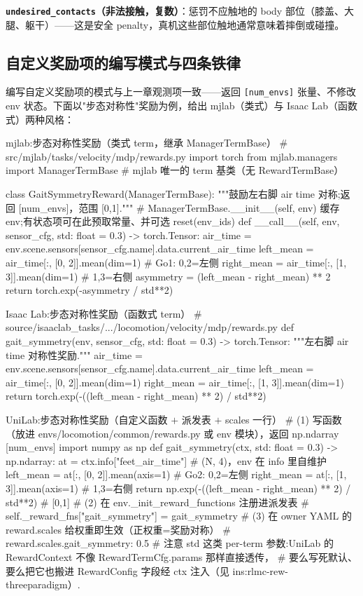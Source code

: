 \textbf{\texttt{undesired\_contacts}（非法接触，复数）}：惩罚不应触地的 body 部位（膝盖、大腿、躯干）——这是安全 penalty，真机这些部位触地通常意味着摔倒或碰撞。

\subsection{自定义奖励项的编写模式与四条铁律}
\label{sec:rlmc-rew-custom}

编写自定义奖励项的模式与上一章观测项一致——返回 \verb|[num_envs]| 张量、不修改 env 状态。下面以"步态对称性"奖励为例，给出 mjlab（类式）与 Isaac Lab（函数式）两种风格：

\begin{codebox}[Python]{mjlab:步态对称性奖励（类式 term，继承 ManagerTermBase）}
# src/mjlab/tasks/velocity/mdp/rewards.py
import torch
from mjlab.managers import ManagerTermBase   # mjlab 唯一的 term 基类（无 RewardTermBase）

class GaitSymmetryReward(ManagerTermBase):
    """鼓励左右脚 air time 对称;返回 [num_envs]，范围 [0,1]."""
    # ManagerTermBase.__init__(self, env) 缓存 env;有状态项可在此预取常量、并可选 reset(env_ids)
    def __call__(self, env, sensor_cfg, std: float = 0.3) -> torch.Tensor:
        air_time = env.scene.sensors[sensor_cfg.name].data.current_air_time
        left_mean  = air_time[:, [0, 2]].mean(dim=1)      # Go1: 0,2=左侧
        right_mean = air_time[:, [1, 3]].mean(dim=1)      # 1,3=右侧
        asymmetry = (left_mean - right_mean) ** 2
        return torch.exp(-asymmetry / std**2)
\end{codebox}

\begin{codebox}[Python]{Isaac Lab:步态对称性奖励（函数式 term）}
# source/isaaclab_tasks/.../locomotion/velocity/mdp/rewards.py
def gait_symmetry(env, sensor_cfg, std: float = 0.3) -> torch.Tensor:
    """左右脚 air time 对称性奖励."""
    air_time = env.scene.sensors[sensor_cfg.name].data.current_air_time
    left_mean  = air_time[:, [0, 2]].mean(dim=1)
    right_mean = air_time[:, [1, 3]].mean(dim=1)
    return torch.exp(-((left_mean - right_mean) ** 2) / std**2)
\end{codebox}

\begin{codebox}[Python]{UniLab:步态对称性奖励（自定义函数 $+$ 派发表 $+$ scales 一行）}
# (1) 写函数（放进 envs/locomotion/common/rewards.py 或 env 模块），返回 np.ndarray [num_envs]
import numpy as np
def gait_symmetry(ctx, std: float = 0.3) -> np.ndarray:
    at = ctx.info["feet_air_time"]                  # (N, 4)，env 在 info 里自维护
    left_mean  = at[:, [0, 2]].mean(axis=1)         # Go2: 0,2=左侧
    right_mean = at[:, [1, 3]].mean(axis=1)         # 1,3=右侧
    return np.exp(-((left_mean - right_mean) ** 2) / std**2)   # [0,1]
# (2) 在 env._init_reward_functions 注册进派发表
#   self._reward_fns["gait_symmetry"] = gait_symmetry
# (3) 在 owner YAML 的 reward.scales 给权重即生效（正权重=奖励对称）
#   reward.scales.gait_symmetry: 0.5
# 注意 std 这类 per-term 参数:UniLab 的 RewardContext 不像 RewardTermCfg.params 那样直接透传，
#   要么写死默认、要么把它也搬进 RewardConfig 字段经 ctx 注入（见 ins:rlmc-rew-threeparadigm）.
\end{codebox}


